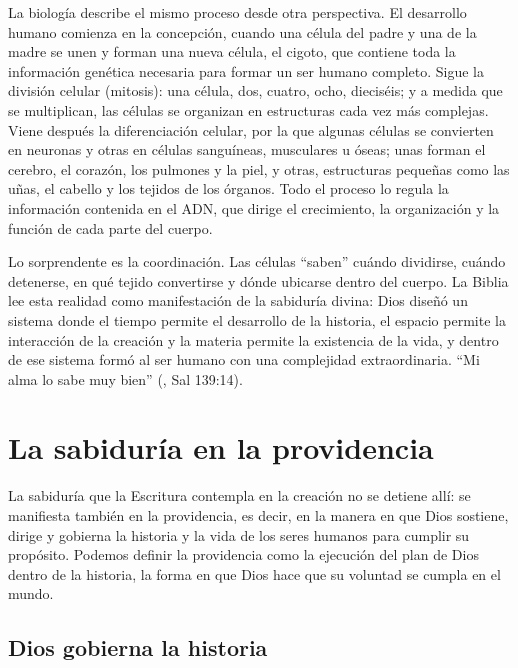La biología describe el mismo proceso desde otra perspectiva. El desarrollo humano comienza en la concepción, cuando una célula del padre y una de la madre se unen y forman una nueva célula, el cigoto, que contiene toda la información genética necesaria para formar un ser humano completo. Sigue la división celular (mitosis): una célula, dos, cuatro, ocho, dieciséis; y a medida que se multiplican, las células se organizan en estructuras cada vez más complejas. Viene después la diferenciación celular, por la que algunas células se convierten en neuronas y otras en células sanguíneas, musculares u óseas; unas forman el cerebro, el corazón, los pulmones y la piel, y otras, estructuras pequeñas como las uñas, el cabello y los tejidos de los órganos. Todo el proceso lo regula la información contenida en el ADN, que dirige el crecimiento, la organización y la función de cada parte del cuerpo.

Lo sorprendente es la coordinación. Las células ``saben'' cuándo dividirse, cuándo detenerse, en qué tejido convertirse y dónde ubicarse dentro del cuerpo. La Biblia lee esta realidad como manifestación de la sabiduría divina: Dios diseñó un sistema donde el tiempo permite el desarrollo de la historia, el espacio permite la interacción de la creación y la materia permite la existencia de la vida, y dentro de ese sistema formó al ser humano con una complejidad extraordinaria. ``Mi alma lo sabe muy bien'' (, Sal 139:14).


\section{La sabiduría en la providencia}

La sabiduría que la Escritura contempla en la creación no se detiene allí: se manifiesta también en la providencia, es decir, en la manera en que Dios sostiene, dirige y gobierna la historia y la vida de los seres humanos para cumplir su propósito. Podemos definir la providencia como la ejecución del plan de Dios dentro de la historia, la forma en que Dios hace que su voluntad se cumpla en el mundo.

\subsection{Dios gobierna la historia}

